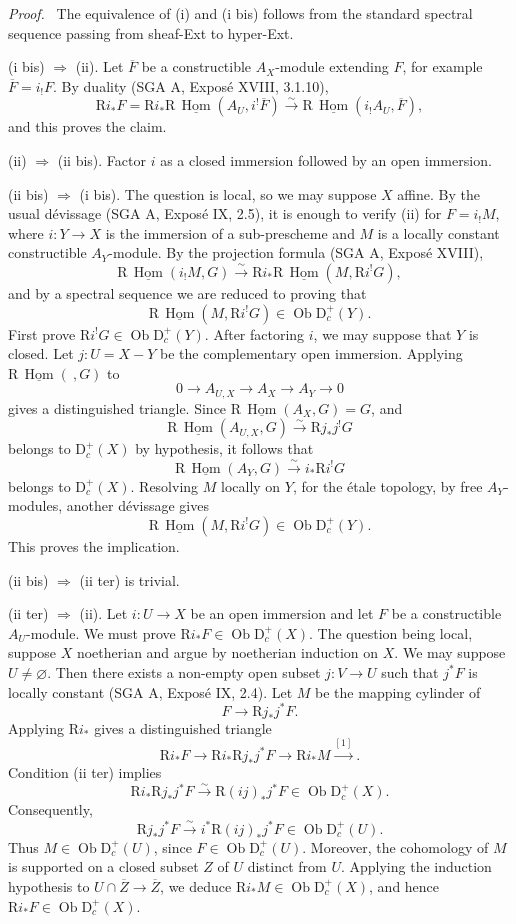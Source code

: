 \documentclass[12pt]{article}
\newcommand{\Hom}{\operatorname{Hom}}
\newcommand{\ob}{\operatorname{Ob}}
\newcommand{\D}{\mathrm D}
\newcommand{\R}{\mathrm R}
\newcommand{\ol}[1]{\overline{#1}}
\newenvironment{prooftext}[1][Proof]{\par\noindent\emph{#1.}\ }{\par\medskip}
\begin{document}
\begin{prooftext}
The equivalence of (i) and (i bis) follows from the standard spectral sequence passing from sheaf-Ext to hyper-Ext.

(i bis) $\Rightarrow$ (ii). Let $\ol F$ be a constructible $A_X$-module extending $F$, for example $\ol F=i_!F$. By duality (SGA A, Exposé XVIII, 3.1.10),
\[
   \R i_*F
    =\R i_*\R\,\underline{\Hom}(A_U,i^!\ol F)
    \xrightarrow{\sim}
      \R\,\underline{\Hom}(i_!A_U,\ol F),
\]
and this proves the claim.

(ii) $\Rightarrow$ (ii bis). Factor $i$ as a closed immersion followed by an open immersion.

(ii bis) $\Rightarrow$ (i bis). The question is local, so we may suppose $X$ affine. By the usual dévissage (SGA A, Exposé IX, 2.5), it is enough to verify (ii) for $F=i_!M$, where $i:Y\to X$ is the immersion of a sub-prescheme and $M$ is a locally constant constructible $A_Y$-module. By the projection formula (SGA A, Exposé XVIII),
\[
   \R\,\underline{\Hom}(i_!M,G)
      \xrightarrow{\sim}
   \R i_*\R\,\underline{\Hom}(M,\R i^!G),
\]
and by a spectral sequence we are reduced to proving that
\[
   \R\,\underline{\Hom}(M,\R i^!G)\in\ob\D_c^+(Y).
\]
First prove $\R i^!G\in\ob\D_c^+(Y)$. After factoring $i$, we may suppose that $Y$ is closed. Let $j:U=X-Y$ be the complementary open immersion. Applying $\R\,\underline{\Hom}(\ ,G)$ to
\[
   0\longrightarrow A_{U,X}\longrightarrow A_X\longrightarrow A_Y\longrightarrow0
\]
gives a distinguished triangle. Since $\R\,\underline{\Hom}(A_X,G)=G$, and
\[
   \R\,\underline{\Hom}(A_{U,X},G)\xrightarrow{\sim}\R j_*j^!G
\]
belongs to $\D_c^+(X)$ by hypothesis, it follows that
\[
   \R\,\underline{\Hom}(A_Y,G)\xrightarrow{\sim}i_*\R i^!G
\]
belongs to $\D_c^+(X)$. Resolving $M$ locally on $Y$, for the étale topology, by free $A_Y$-modules, another dévissage gives
\[
   \R\,\underline{\Hom}(M,\R i^!G)\in\ob\D_c^+(Y).
\]
This proves the implication.

(ii bis) $\Rightarrow$ (ii ter) is trivial.

(ii ter) $\Rightarrow$ (ii). Let $i:U\to X$ be an open immersion and let $F$ be a constructible $A_U$-module. We must prove $\R i_*F\in\ob\D_c^+(X)$. The question being local, suppose $X$ noetherian and argue by noetherian induction on $X$. We may suppose $U\ne\varnothing$. Then there exists a non-empty open subset $j:V\to U$ such that $j^*F$ is locally constant (SGA A, Exposé IX, 2.4). Let $M$ be the mapping cylinder of
\[
   F\longrightarrow \R j_*j^*F.
\]
Applying $\R i_*$ gives a distinguished triangle
\[
   \R i_*F\longrightarrow \R i_*\R j_*j^*F
       \longrightarrow \R i_*M\xrightarrow{[1]}.
\]
Condition (ii ter) implies
\[
   \R i_*\R j_*j^*F\xrightarrow{\sim}\R(ij)_*j^*F\in\ob\D_c^+(X).
\]
Consequently,
\[
   \R j_*j^*F\xrightarrow{\sim}i^*\R(ij)_*j^*F\in\ob\D_c^+(U).
\]
Thus $M\in\ob\D_c^+(U)$, since $F\in\ob\D_c^+(U)$. Moreover, the cohomology of $M$ is supported on a closed subset $Z$ of $U$ distinct from $U$. Applying the induction hypothesis to $U\cap\ol Z\to\ol Z$, we deduce $\R i_*M\in\ob\D_c^+(X)$, and hence $\R i_*F\in\ob\D_c^+(X)$.


\end{prooftext}
\end{document}
